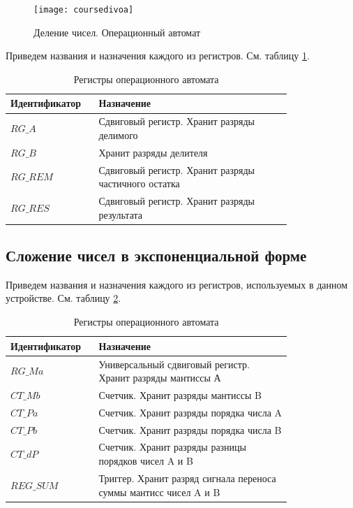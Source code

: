 \documentclass[a4paper,14pt]{extarticle}
\begin{document}
\begin{figure}[htp]
	\centering
	\texttt{[image: coursedivoa]}
	\caption{Деление чисел. Операционный автомат}
	\label{fig:courseoperationautomat}
\end{figure}


Приведем названия и назначения каждого из регистров. См. таблицу \ref{tab:course_op1_regs}.
\begin{table}[h!]
	\centering
	\small
	\begin{tabular}{|m{0.2\linewidth}|m{0.6\linewidth}|}
		\hline
		\textbf{Идентификатор} & \textbf{Назначение} \\ \hline
		$RG\_A$ & Сдвиговый регистр. Хранит разряды делимого \\ \hline
		$RG\_B$ & Хранит разряды делителя \\ \hline
		$RG\_REM$ & Сдвиговый регистр. Хранит разряды частичного остатка \\ \hline
		$RG\_RES$ & Сдвиговый регистр. Хранит разряды результата \\ \hline
	\end{tabular}
	\caption{Регистры операционного автомата}
	\label{tab:course_op1_regs}
\end{table}
\subsection{Сложение чисел в экспоненциальной форме}
Приведем названия и назначения каждого из регистров, используемых в данном устройстве. См. таблицу \ref{tab:course_op2_regs}.
\begin{table}[h!]
	\centering
	\small
	\begin{tabular}{|m{0.2\linewidth}|m{0.6\linewidth}|}
		\hline
		\textbf{Идентификатор} & \textbf{Назначение} \\ \hline
		$RG\_Ma$ & Универсальный сдвиговый регистр. Хранит разряды мантиссы А\\ \hline
		$CT\_Mb$ & Счетчик. Хранит разряды мантиссы B\\ \hline
		$CT\_Pa$ & Счетчик. Хранит разряды порядка числа A \\\hline
		$CT\_Pb$ & Счетчик. Хранит разряды порядка числа B \\ \hline
		$CT\_dP$ & Счетчик. Хранит разряды разницы порядков чисел A и B\\ \hline
		$REG\_SUM$& Триггер. Хранит разряд сигнала переноса суммы мантисс чисел A и B\\\hline
	\end{tabular}
	\caption{Регистры операционного автомата}
	\label{tab:course_op2_regs}
\end{table}
\end{document}
